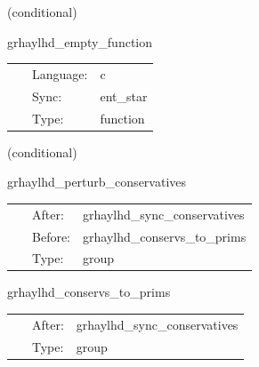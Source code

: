 \vspace{5mm}

   (conditional) 

\hspace{5mm} grhaylhd\_empty\_function 

\hspace{5mm}{\it sync allocated entropy conservatives } 


\hspace{5mm}

 \begin{tabular*}{160mm}{cll} 
~ & Language:  & c \\ 
~ & Sync:  & ent\_star \\ 
~ & Type:  & function \\ 
\end{tabular*} 


\vspace{5mm}

   (conditional) 

\hspace{5mm} grhaylhd\_perturb\_conservatives 

\hspace{5mm}{\it perturb conservatives before con2prim } 


\hspace{5mm}

 \begin{tabular*}{160mm}{cll} 
~ & After:  & grhaylhd\_sync\_conservatives \\ 
~ & Before:  & grhaylhd\_conservs\_to\_prims \\ 
~ & Type:  & group \\ 
\end{tabular*} 


\vspace{5mm}


\hspace{5mm} grhaylhd\_conservs\_to\_prims 

\hspace{5mm}{\it compute primitive variables from conservatives } 


\hspace{5mm}

 \begin{tabular*}{160mm}{cll} 
~ & After:  & grhaylhd\_sync\_conservatives \\ 
~ & Type:  & group \\ 
\end{tabular*} 



